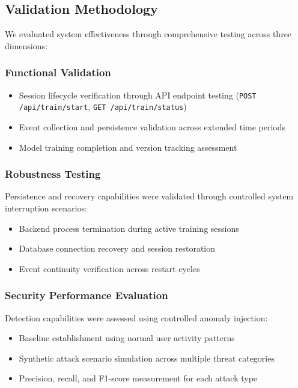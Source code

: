 \documentclass[conference]{IEEEtran}
\begin{document}
\subsection{Validation Methodology}
We evaluated system effectiveness through comprehensive testing across three dimensions:

\subsubsection{Functional Validation}
\begin{itemize}[leftmargin=*]
  \item Session lifecycle verification through API endpoint testing (\texttt{POST /api/train/start}, \texttt{GET /api/train/status})
  \item Event collection and persistence validation across extended time periods
  \item Model training completion and version tracking assessment
\end{itemize}

\subsubsection{Robustness Testing}
Persistence and recovery capabilities were validated through controlled system interruption scenarios:
\begin{itemize}[leftmargin=*]
  \item Backend process termination during active training sessions
  \item Database connection recovery and session restoration
  \item Event continuity verification across restart cycles
\end{itemize}

\subsubsection{Security Performance Evaluation}
Detection capabilities were assessed using controlled anomaly injection:
\begin{itemize}[leftmargin=*]
  \item Baseline establishment using normal user activity patterns
  \item Synthetic attack scenario simulation across multiple threat categories
  \item Precision, recall, and F1-score measurement for each attack type
\end{itemize}
\end{document}
